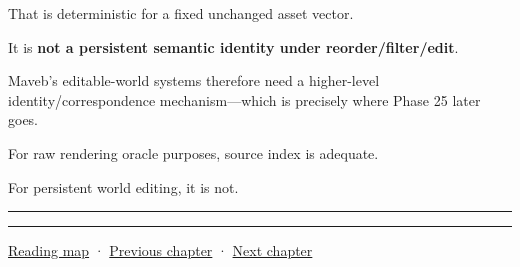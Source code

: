 That is deterministic for a fixed unchanged asset vector.

It is \textbf{not a persistent semantic identity under reorder/filter/edit}.

Maveb's editable-world systems therefore need a higher-level identity/correspondence mechanism---which is precisely where Phase 25 later goes.

For raw rendering oracle purposes, source index is adequate.

For persistent world editing, it is not.

\begin{center}\rule{0.5\linewidth}{0.5pt}\end{center}

\begin{center}\rule{0.5\linewidth}{0.5pt}\end{center}

\hyperref[volume-reading-map]{Reading map} · \hyperref[04-visual-computing-ii-ch036-source-atlas-and-reconstruction-checkpoints]{Previous chapter} · \hyperref[04-visual-computing-ii-ch038-projecting-ellipsoids-into-screen-space-conics]{Next chapter}
